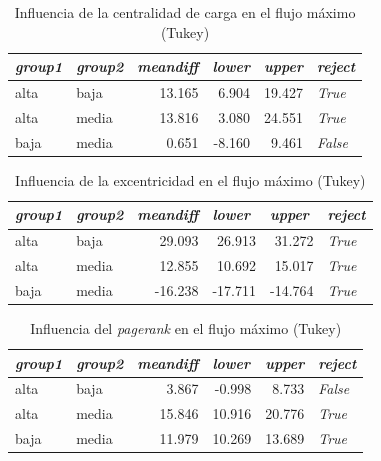 \documentclass{article}
\begin{document}
\newpage
\begin{table}[htbp]
  \centering
  \caption{Influencia de la centralidad de carga en el flujo máximo (Tukey)}
    \begin{tabular}{llrrrl}
    \toprule
    \textit{\textbf{group1}} & \textit{\textbf{group2}} & \multicolumn{1}{l}{\textit{\textbf{meandiff}}} & \multicolumn{1}{l}{\textit{\textbf{lower}}} & \multicolumn{1}{l}{\textit{\textbf{upper}}} & \textit{\textbf{reject}} \\
    \midrule
    alta  & baja  & 13.165 & 6.904 & 19.427 & \textit{True} \\
    alta  & media & 13.816 & 3.080 & 24.551 & \textit{True} \\
    baja  & media & 0.651 & -8.160 & 9.461 & \textit{False} \\
    \bottomrule
    \end{tabular}%
  \label{tab:t30}%
\end{table}%
\begin{table}[htbp]
  \centering
  \caption{Influencia de la excentricidad en el flujo máximo (Tukey)}
    \begin{tabular}{llrrrl}
    \toprule
    \textit{\textbf{group1}} & \textit{\textbf{group2}} & \multicolumn{1}{l}{\textit{\textbf{meandiff}}} & \multicolumn{1}{l}{\textit{\textbf{lower}}} & \multicolumn{1}{l}{\textit{\textbf{upper}}} & \textit{\textbf{reject}} \\
    \midrule
    alta  & baja  & 29.093 & 26.913 & 31.272 & \textit{True} \\
    alta  & media & 12.855 & 10.692 & 15.017 & \textit{True} \\
    baja  & media & -16.238 & -17.711 & -14.764 & \textit{True} \\
    \bottomrule
    \end{tabular}%
  \label{tab:t31}%
\end{table}
\begin{table}[htbp]
  \centering
  \caption{Influencia del \textit{pagerank} en el flujo máximo (Tukey)}
    \begin{tabular}{llrrrl}
    \toprule
    \textit{\textbf{group1}} & \textit{\textbf{group2}} & \multicolumn{1}{l}{\textit{\textbf{meandiff}}} & \multicolumn{1}{l}{\textit{\textbf{lower}}} & \multicolumn{1}{l}{\textit{\textbf{upper}}} & \textit{\textbf{reject}} \\
    \midrule
    alta  & baja  & 3.867 & -0.998 & 8.733 & \textit{False} \\
    alta  & media & 15.846 & 10.916 & 20.776 & \textit{True} \\
    baja  & media & 11.979 & 10.269 & 13.689 & \textit{True} \\
    \bottomrule
    \end{tabular}%
  \label{tab:t32}%
\end{table}%
\end{document}
